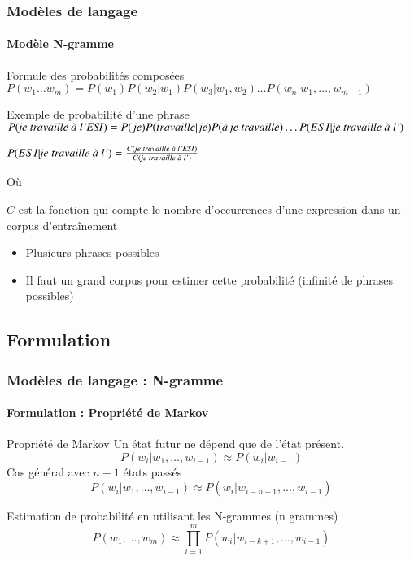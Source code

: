 \documentclass[xcolor=table]{beamer}
\begin{document}
\begin{frame}
\frametitle{Modèles de langage}
\framesubtitle{Modèle N-gramme}

\begin{block}{Formule des probabilités composées}
	$ P(w_1 \ldots w_m) =  P(w_1) P(w_2 | w_1) P(w_3 | w_1, w_2) \ldots P(w_n | w_1, \ldots, w_{m-1})$
\end{block}


\begin{exampleblock}{Exemple de probabilité d'une phrase}
	$ P(\text{\textit{je travaille à l'ESI}}) =  P(je) P(travaille | je) P(\text{\textit{à}} | \text{\textit{je travaille}}) \ldots P(ESI | \text{\textit{je travaille à l'}})$
	
	$P(ESI | \text{\textit{je travaille à l'}}) = \frac{C(\text{\textit{je travaille à l'ESI}})}{C( \text{\textit{je travaille à l'}})}$ 
	
	Où 
	
	$C$ est la fonction qui compte le nombre d'occurrences d'une expression dans un corpus d'entraînement
\end{exampleblock}

\begin{itemize}
	\item Plusieurs phrases possibles
	\item Il faut un grand corpus pour estimer cette probabilité (infinité de phrases possibles)
\end{itemize}

\end{frame}

\subsection{Formulation}

\begin{frame}
\frametitle{Modèles de langage : N-gramme}
\framesubtitle{Formulation : Propriété de Markov}

\begin{block}{Propriété de Markov}
	Un état futur ne dépend que de l'état présent. 
	\[%
	P(w_i | w_1,\ldots, w_{i-1}) \approx P(w_i | w_{i-1})
	\]
	Cas général avec $n-1$ états passés 
	\[%
	P(w_i | w_1,\ldots, w_{i-1}) \approx P(w_i | w_{i-n+1}, \ldots, w_{i-1})
	\]
\end{block}

\begin{block}{Estimation de probabilité en utilisant les N-grammes (n grammes)}
	\[
	P(w_1,\ldots, w_{m}) \approx \prod_{i=1}^m P(w_i | w_{i-k+1}, \ldots, w_{i-1})
	\]
\end{block}

\end{frame}
\end{document}
